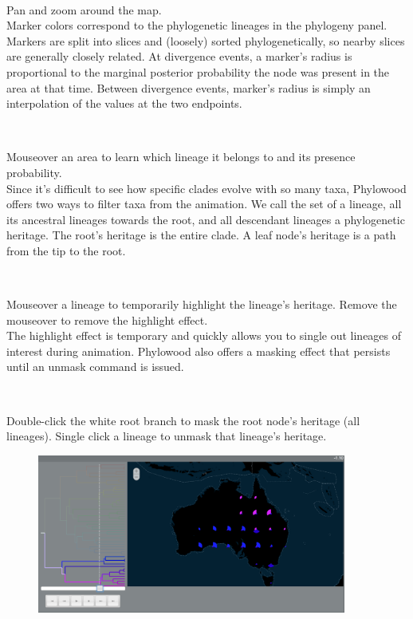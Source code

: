 \documentclass[11pt]{article}
\newcommand{\impmark}{\strut\vadjust{\domark}}
\newcommand{\domark}{%
  \vbox to 0pt{
    \kern-\dp\strutbox
    \smash{\llap{$\rightarrow$\kern1em}}
    \vss
  }%
}
\begin{document}
\noindent \\ \impmark Pan and zoom around the map.\\

Marker colors correspond to the phylogenetic lineages in the phylogeny panel.
Markers are split into slices and (loosely) sorted phylogenetically, so nearby slices are generally closely related.
At divergence events, a marker's radius is proportional to the marginal posterior probability the node was present in the area at that time.
Between divergence events, marker's radius is simply an interpolation of the values at the two endpoints.

\noindent \\ \impmark Mouseover an area to learn which lineage it belongs to and its presence probability. \\

Since it's difficult to see how specific clades evolve with so many taxa, Phylowood offers two ways to filter taxa from the animation.
We call the set of a lineage, all its ancestral lineages towards the root, and all descendant lineages a phylogenetic heritage.
The root's heritage is the entire clade.
A leaf node's heritage is a path from the tip to the root.

\noindent \\ \impmark Mouseover a lineage to temporarily highlight the lineage's heritage. Remove the mouseover to remove the highlight effect. \\

The highlight effect is temporary and quickly allows you to single out lineages of interest during animation.
Phylowood also offers a masking effect that persists until an unmask command is issued.

\noindent \\ \impmark Double-click the white root branch to mask the root node's heritage (all lineages). Single click a lineage to unmask that lineage's heritage. \\

\begin{figure}[H]
\centering
\includegraphics[width=4in]{figures/phw_mask}
\end{figure}
\end{document}
